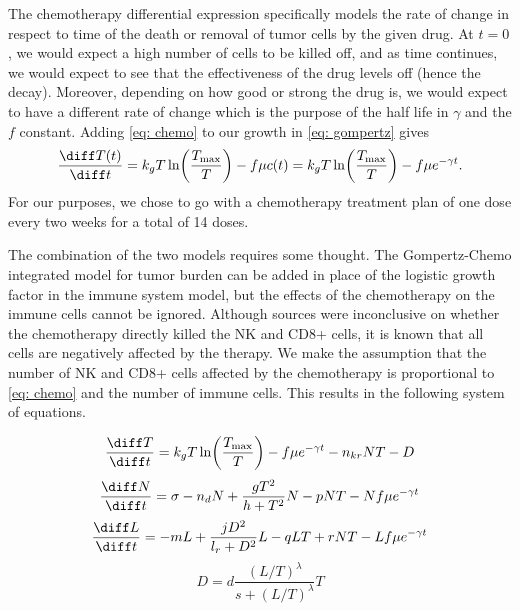 \documentclass[11pt]{amsart}
\begin{document}
The chemotherapy differential expression specifically models the rate of change in respect to time of the death or removal of tumor cells by the given drug.
At $t=0$, we would expect a high number of cells to be killed off, and as time continues, we would expect to see that the effectiveness of the drug levels off (hence the decay).
Moreover, depending on how good or strong the drug is, we would expect to have a different rate of change which is the purpose of the half life in $\gamma$ and the $f$ constant.
Adding \eqref{eq: chemo} to our growth in \eqref{eq: gompertz} gives 
\begin{equation}
	\frac{\diff T(t)}{\diff t} = k_g T \ln \biggl(\frac{T_{\max}}{T} \biggr) - f \mu c(t) =k_g T \ln \biggl(\frac{T_{\max}}{T} \biggr) - f \mu e^{-\gamma t} \label{eq: gompertz-chemo}.
\end{equation}
For our purposes, we chose to go with a chemotherapy treatment plan of one dose every two weeks for a total of 14 doses. 



The combination of the two models requires some thought. The Gompertz-Chemo integrated model for tumor burden can be added in place of the logistic growth factor in the immune system model, but the effects of the chemotherapy on the immune cells cannot be ignored. Although sources were inconclusive on whether the chemotherapy directly killed the NK and CD8+ cells, it is known that all cells are negatively affected by the therapy. We make the assumption that the number of NK and CD8+ cells affected by the chemotherapy is proportional to \eqref{eq: chemo} and the number of immune cells. This results in the following system of equations.

\begin{equation} \label{eq1}
\frac{\diff T}{\diff t} = k_g T \ln \biggl(\frac{T_{\max}}{T} \biggr) - f \mu e^{-\gamma t} - n_{kr}NT - D 
\end{equation}
\begin{equation} \label{eq2}
\frac{\diff N}{\diff t} = \sigma - n_dN +\frac{gT^2}{h + T^2}N - pNT - Nf \mu e^{-\gamma t}
\end{equation}
\begin{equation} \label{eq3}
\frac{\diff L}{\diff t} = - mL +\frac{jD^2}{l_r + D^2}L - qLT + rNT - Lf \mu e^{-\gamma t}
\end{equation}
\begin{equation} \label{eq4}
D = d\frac{(L/T)^\lambda}{s + (L/T)^\lambda}T
\end{equation}
\end{document}
